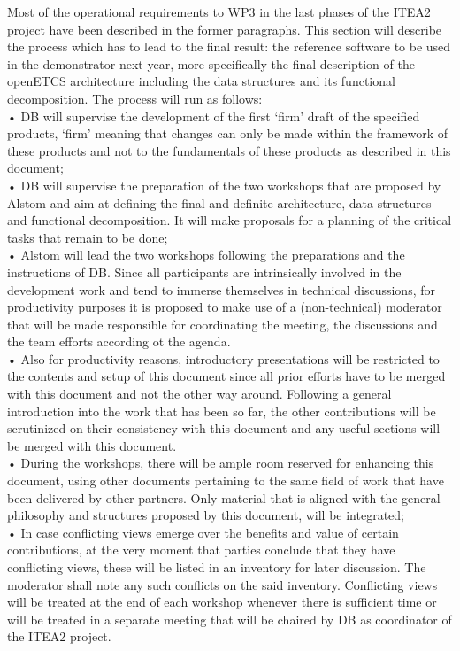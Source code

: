 \documentclass{template/openetcs_report}
\begin{document}
Most of the operational requirements to WP3 in the last phases of the ITEA2 project have been described in the former paragraphs. This section will describe the process which has to lead to the final result: the reference software to be used in the demonstrator next year, more specifically the final description of the openETCS architecture including the data structures and its functional decomposition. The process will run as follows:\\
•	DB will supervise  the development of the first ‘firm’ draft of the specified products, ‘firm’ meaning that changes can only be made within the framework of these products and not to the fundamentals of these products as described in this document; \\
•	DB will supervise the preparation of the two workshops that are proposed by Alstom and aim at defining the final and definite architecture, data structures and functional decomposition. It will make proposals for a planning of the critical tasks that remain to be done;\\
•	Alstom will lead the two workshops following the preparations and the instructions of DB. Since all participants are intrinsically involved in the development work and tend to immerse themselves in technical discussions, for productivity purposes it is proposed to make use of a (non-technical) moderator that will be made responsible for coordinating the meeting, the discussions and the team efforts according ot the agenda.\\
•	Also for productivity reasons, introductory presentations will be restricted to the contents and setup of this document since all prior efforts have to be merged with this document and not the other way around. Following a general introduction into the work that has been so far, the other contributions will be scrutinized on their consistency with this document and any useful sections will be merged with this document.\\
•	During the workshops, there will be ample room reserved for enhancing this document, using other documents pertaining to the same field of work that have been delivered by other partners. Only material that is aligned with the general philosophy and structures proposed by this document, will be integrated;\\
•	In case conflicting views emerge over the benefits and value of certain contributions, at the very moment that parties conclude that they have conflicting views, these will be listed in an inventory for later discussion. The moderator shall note any such conflicts on the said inventory. Conflicting views will be treated at the end of each workshop whenever there is sufficient time or will be treated in a separate meeting that will be chaired by DB as coordinator of the ITEA2 project.\\
\end{document}
